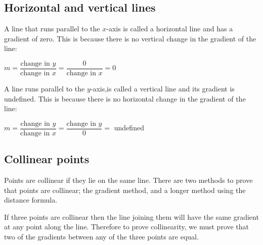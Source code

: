 \subsection*{Horizontal and vertical lines}

A line that runs parallel to the $x$-axis is called a horizontal line and has a gradient of zero. This is
because there is no vertical change in the gradient of the line:\par
$m = \dfrac{\mbox{change in }y}{\mbox{change in }x} = \dfrac{0}{\mbox{change in }x} =0$\par

A line runs parallel to the $y$-axis,is called a vertical line and its gradient is undefined. This is because there is no horizontal change in the gradient of the line:\par
$m = \dfrac{\mbox{change in }y}{\mbox{change in }x} = \dfrac{\mbox{change in }y}{0}=$ undefined\par

\subsection*{Collinear points}

Points are collinear if they lie on the same line. There are two methods to prove that points are collinear; the gradient method, and a
longer method using the distance formula.

If three points are collinear then the line joining them will have the same gradient at any point along the line.
Therefore to prove collinearity, we must prove that two of the gradients between any of the three points are
equal.

